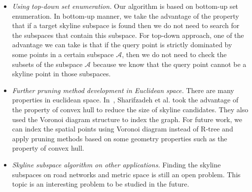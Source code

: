 \begin{itemize}
   
\item \textit{Using top-down set enumeration.} Our algorithm is based on bottom-up set enumeration. In bottom-up manner, we take the advantage of the property that if a target skyline subspace is found then we do not need to search for the subspaces that contain this subspace. For top-down approach, one of the advantage we can take is that if the query point is strictly dominated by some points in a certain subspace $\mathcal{A}$, then we do not need to check the subsets of the subspace $\mathcal{A}$ because we know that the query point cannot be a skyline point in those subspaces.

\item \textit{Further pruning method development in Euclidean space.} There are many properties in euclidean space. In~\cite{sharifzadeh2006spatial}, Sharifzadeh et al. took the advantage of the property of convex hull to reduce the size of skyline candidates. They also used the Voronoi diagram structure to index the graph. For future work, we can index the spatial points using Voronoi diagram instead of R-tree and apply pruning methods based on some geometry properties such as the property of convex hull.

\item \textit{Skyline subspace algorithm on other applications.} Finding the skyline subspaces on road networks and metric space is still an open problem. This topic is an interesting problem to be studied in the future.

\end{itemize}














